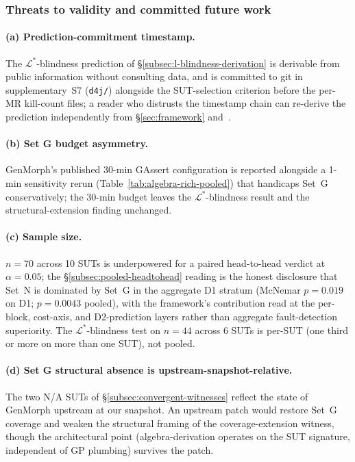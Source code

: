 \documentclass[acmsmall, screen]{acmart}
\begin{document}
\subsubsection{Threats to validity and committed future work}
\label{subsec:empirical-threats}

\paragraph{(a) Prediction-commitment timestamp.}
The $\mathcal{L}^{*}$-blindness prediction of \S\ref{subsec:l-blindness-derivation} is derivable from public information without consulting data, and is committed to git in supplementary~S7 (\texttt{d4j/}) alongside the SUT-selection criterion before the per-MR kill-count files; a reader who distrusts the timestamp chain can re-derive the prediction independently from \S\ref{sec:framework} and~\cite{Coles2016PIT}.

\paragraph{(b) Set G budget asymmetry.}
GenMorph's published 30-min GAssert configuration is reported alongside a 1-min sensitivity rerun (Table~\ref{tab:algebra-rich-pooled}) that handicaps Set~G conservatively; the 30-min budget leaves the $\mathcal{L}^{*}$-blindness result and the structural-extension finding unchanged.

\paragraph{(c) Sample size.}
$n = 70$ across 10 SUTs is underpowered for a paired head-to-head verdict at $\alpha = 0.05$; the \S\ref{subsec:pooled-headtohead} reading is the honest disclosure that Set~N is dominated by Set~G in the aggregate D1 stratum (McNemar $p = 0.019$ on D1; $p = 0.0043$ pooled), with the framework's contribution read at the per-block, cost-axis, and D2-prediction layers rather than aggregate fault-detection superiority. The $\mathcal{L}^{*}$-blindness test on $n = 44$ across 6 SUTs is per-SUT (one third or more on more than one SUT), not pooled.

\paragraph{(d) Set G structural absence is upstream-snapshot-relative.}
The two N/A SUTs of \S\ref{subsec:convergent-witnesses} reflect the state of GenMorph upstream at our snapshot. An upstream patch would restore Set~G coverage and weaken the structural framing of the coverage-extension witness, though the architectural point (algebra-derivation operates on the SUT signature, independent of GP plumbing) survives the patch.
\end{document}
